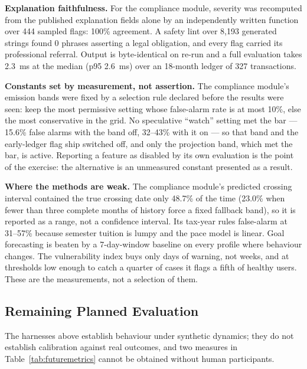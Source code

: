 \documentclass[conference]{IEEEtran}
\begin{document}
\textbf{Explanation faithfulness.} For the compliance module, severity was recomputed from the published explanation fields alone by an independently written function over 444 sampled flags: 100\% agreement. A safety lint over 8{,}193 generated strings found 0 phrases asserting a legal obligation, and every flag carried its professional referral. Output is byte-identical on re-run and a full evaluation takes 2.3~ms at the median (p95 2.6~ms) over an 18-month ledger of 327 transactions.

\textbf{Constants set by measurement, not assertion.} The compliance module's emission bands were fixed by a selection rule declared before the results were seen: keep the most permissive setting whose false-alarm rate is at most 10\%, else the most conservative in the grid. No speculative ``watch'' setting met the bar --- 15.6\% false alarms with the band off, 32--43\% with it on --- so that band and the early-ledger flag ship switched off, and only the projection band, which met the bar, is active. Reporting a feature as disabled by its own evaluation is the point of the exercise: the alternative is an unmeasured constant presented as a result.

\textbf{Where the methods are weak.} The compliance module's predicted crossing interval contained the true crossing date only 48.7\% of the time (23.0\% when fewer than three complete months of history force a fixed fallback band), so it is reported as a range, not a confidence interval. Its tax-year rules false-alarm at 31--57\% because semester tuition is lumpy and the pace model is linear. Goal forecasting is beaten by a 7-day-window baseline on every profile where behaviour changes. The vulnerability index buys only days of warning, not weeks, and at thresholds low enough to catch a quarter of cases it flags a fifth of healthy users. These are the measurements, not a selection of them.

\subsection{Remaining Planned Evaluation}

The harnesses above establish behaviour under synthetic dynamics; they do not establish calibration against real outcomes, and two measures in Table~\ref{tab:futuremetrics} cannot be obtained without human participants.
\end{document}
